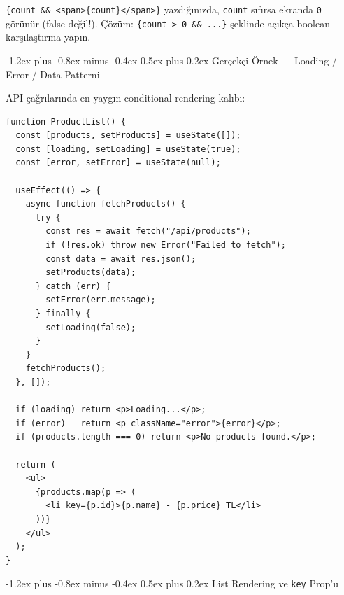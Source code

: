 \documentclass[12pt, a4paper]{article}
\makeatletter
\renewcommand{\subsection}{%
  \@startsection{subsection}{2}{\z@}%
    {-1.2ex plus -0.8ex minus -0.4ex}%
    {0.5ex plus 0.2ex}%
    {\normalfont\large\bfseries\sffamily\color{secondary}}%
}
\makeatother
\begin{document}
\vspace{6pt}

\begin{dangerbox}
\texttt{\{count \&\& <span>\{count\}</span>\}} yazdığınızda,
\texttt{count} sıfırsa ekranda \texttt{0} görünür (false değil!).
Çözüm: \texttt{\{count > 0 \&\& ...\}} şeklinde açıkça boolean karşılaştırma yapın.
\end{dangerbox}

\newpage
\subsection{Gerçekçi Örnek --- Loading / Error / Data Patterni}

API çağrılarında en yaygın conditional rendering kalıbı:

\vspace{6pt}

\begin{tcolorbox}[enhanced, colback=codebg, colframe=gray!30,
    colbacktitle=primary!85!black, coltitle=white, arc=4pt,
    title={\sffamily\bfseries\small Loading / Error / Data}]
\begin{lstlisting}[style=jsxstyle]
function ProductList() {
  const [products, setProducts] = useState([]);
  const [loading, setLoading] = useState(true);
  const [error, setError] = useState(null);

  useEffect(() => {
    async function fetchProducts() {
      try {
        const res = await fetch("/api/products");
        if (!res.ok) throw new Error("Failed to fetch");
        const data = await res.json();
        setProducts(data);
      } catch (err) {
        setError(err.message);
      } finally {
        setLoading(false);
      }
    }
    fetchProducts();
  }, []);

  if (loading) return <p>Loading...</p>;
  if (error)   return <p className="error">{error}</p>;
  if (products.length === 0) return <p>No products found.</p>;

  return (
    <ul>
      {products.map(p => (
        <li key={p.id}>{p.name} - {p.price} TL</li>
      ))}
    </ul>
  );
}
\end{lstlisting}
\end{tcolorbox}

\subsection{List Rendering ve \texttt{key} Prop'u}
\end{document}
